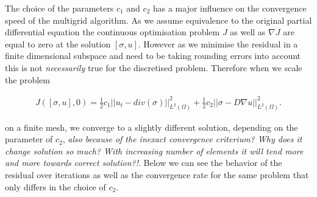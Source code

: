 \documentclass[../draft_1.tex]{subfiles}
\begin{document}
The choice of the parameters $c_1$ and $c_2$ has a major influence on the convergence speed of the multigrid algorithm. As we assume equivalence to the original partial differential equation the continuous optimisation problem $J$ as well as $\nabla J$ are equal to zero at the solution $[\sigma, u]$. However as we minimise the residual in a finite dimensional subspace and need to be taking rounding errors into account this is not \textit{necessarily} true for the discretised problem. Therefore when we scale the problem 

\begin{ceqn}
	\begin{equation}
	\begin{aligned}
 J([\sigma, u], 0) = \frac{1}{2} c_1 || u_t - div(\sigma) ||_{L^2(\Omega)}^2 + \frac{1}{2} c_2 || \sigma - D \nabla u ||_{L^2(\Omega)}^2.
	\end{aligned}
	\end{equation}
\end{ceqn}

on a finite mesh, we converge to a slightly different solution, depending on the parameter of $c_2$, \textit{also because of the inexact convergence criterium? Why does it change solution so much? With increasing number of elements it will tend more and more towards correct solution?!}.  Below we can see the behavior of the residual over iterations as well as the convergence rate for the same problem that only differs in the choice of $c_2$.
\end{document}
